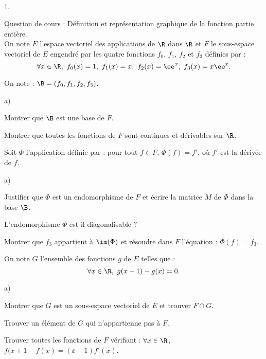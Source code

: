 \documentclass[11pt]{article}%
\begin{document}
\begin{exerciceAP}~
  \begin{noliste}{1.}
    \setlength{\itemsep}{2mm}
  \item Question de cours : Définition et représentation graphique de
    la fonction partie entière.\\
    On note $E$ l'espace vectoriel des applications de $\R$ dans $\R$
    et $F$ le sous-espace vectoriel de $E$ engendré par les quatre
    fonctions $f_0$, $f_1$, $f_2$ et $f_3$ définies par :
    \[
    \forall x\in\R, \ f_0(x)=1, \ f_1(x)=x, \ f_2(x)=\ee^x, \
    f_3(x)=x\ee^x.
    \]

  \item On note : $\B=(f_0,f_1,f_2,f_3)$.
    \begin{noliste}{a)}
    \setlength{\itemsep}{2mm}
    \item Montrer que $\B$ est une base de $F$.
    \item Montrer que toutes les fonctions de $F$ sont continues et
      dérivables sur $\R$.
    \end{noliste}

  \item Soit $\Phi$ l'application définie par : pour tout $f\in F$,
    $\Phi(f)=f'$, où $f'$ est la dérivée de $f$.
    \begin{noliste}{a)}
    \setlength{\itemsep}{2mm}
    \item Justifier que $\Phi$ est un endomorphisme de $F$ et écrire
      la matrice $M$ de $\Phi$ dans la base $\B$.
    \item L'endomorphisme $\Phi$ est-il diagonalisable ?
    \item Montrer que $f_3$ appartient à $\im(\Phi)$ et résoudre dans
      $F$ l'équation : $\Phi(f)=f_3$.
    \end{noliste}

  \item On note $G$ l'ensemble des fonctions $g$ de $E$ telles que :
    \[
    \forall x\in\R, \ g(x+1)-g(x)=0.
    \]
    \begin{noliste}{a)}
    \setlength{\itemsep}{2mm}
    \item Montrer que $G$ est un sous-espace vectoriel de $E$ et
      trouver $F\cap G$.
    \item Trouver un élément de $G$ qui n'appartienne pas à $F$.
    \end{noliste}
  \item Trouver toutes les fonctions de $F$ vérifiant : $\forall
    x\in\R$, $f(x+1-f(x)=(\ee -1)f'(x)$.
  \end{noliste}
\end{exerciceAP}
\end{document}
